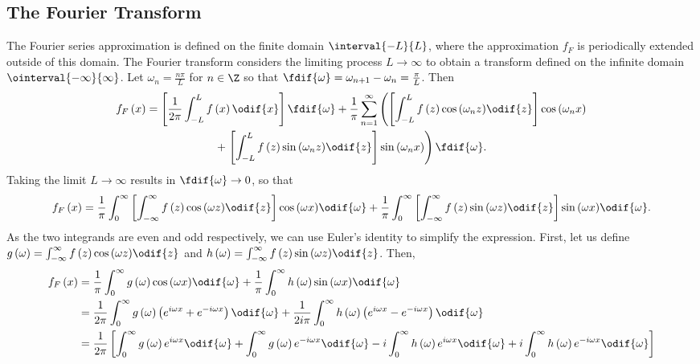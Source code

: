 \documentclass{article}
\begin{document}
\subsection{The Fourier Transform}
The Fourier series approximation is defined on the finite domain
\(\interval{-L}{L}\), where the approximation \(f_F\) is periodically
extended outside of this domain. The Fourier transform considers the
limiting process \(L \to \infty\) to obtain a transform defined on the
infinite domain \(\ointerval{-\infty}{\infty}\). Let \(\omega_n =
\frac{n \pi}{L}\) for \(n \in \Z\) so that \(\fdif{\omega} = \omega_{n
+ 1} - \omega_n = \frac{\pi}{L}\). Then
\begin{multline*}
    f_F\left( x \right) = \left[ \frac{1}{2\pi} \int_{-L}^L f\left( x \right) \odif{x} \right] \fdif{\omega}
    + \frac{1}{\pi} \sum_{n = 1}^\infty
    \left( \left[ \int_{-L}^L f\left( z \right) \cos{\left( \omega_n z \right)} \odif{z} \right] \cos{\left( \omega_n x \right)} \right. \\
    + \left. \left[ \int_{-L}^L f\left( z \right) \sin{\left( \omega_n z \right)} \odif{z} \right] \sin{\left( \omega_n x \right)} \right) \fdif{\omega}.
\end{multline*}
Taking the limit \(L \to \infty\) results in \(\fdif{\omega} \to 0\), so that
\begin{equation*}
    f_F\left( x \right) = \frac{1}{\pi} \int_0^\infty \left[ \int_{-\infty}^\infty f\left( z \right) \cos{\left( \omega z \right)} \odif{z} \right] \cos{\left( \omega x \right)} \odif{\omega} + \frac{1}{\pi} \int_0^\infty \left[ \int_{-\infty}^\infty f\left( z \right) \sin{\left( \omega z \right)} \odif{z} \right] \sin{\left( \omega x \right)} \odif{\omega}.
\end{equation*}
As the two integrands are even and odd respectively, we can use Euler's
identity to simplify the expression. First, let us define
\(g\left( \omega \right) = \int_{-\infty}^\infty f\left( z \right) \cos{\left( \omega z \right)} \odif{z}\)
and \(h\left( \omega \right) = \int_{-\infty}^\infty f\left( z \right) \sin{\left( \omega z \right)} \odif{z}\).
Then,
\begin{align*}
    f_F\left( x \right) & = \frac{1}{\pi} \int_0^\infty g\left( \omega \right) \cos{\left( \omega x \right)} \odif{\omega} + \frac{1}{\pi} \int_0^\infty h\left( \omega \right) \sin{\left( \omega x \right)} \odif{\omega}                                                                                                                    \\
                        & = \frac{1}{2 \pi} \int_0^\infty g\left( \omega \right) \left( e^{i \omega x} + e^{-i \omega x} \right) \odif{\omega} + \frac{1}{2i \pi} \int_0^\infty h\left( \omega \right) \left( e^{i \omega x} - e^{-i \omega x} \right) \odif{\omega}                                                                           \\
                        & = \frac{1}{2 \pi} \left[ \int_0^\infty g\left( \omega \right) e^{i \omega x} \odif{\omega} + \int_0^\infty g\left( \omega \right) e^{-i \omega x} \odif{\omega} - i \int_0^\infty h\left( \omega \right) e^{i \omega x} \odif{\omega} + i \int_0^\infty h\left( \omega \right) e^{-i \omega x} \odif{\omega} \right]
\end{align*}
\end{document}
